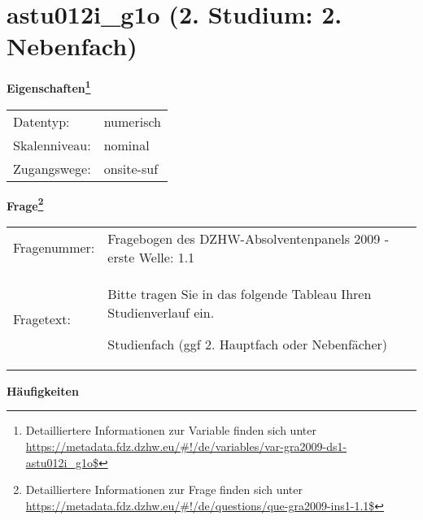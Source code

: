 
    \setcounter{footnote}{0}

    \vspace*{-1.8cm}
	\section{astu012i\_g1o (2. Studium: 2. Nebenfach)}
	\label{section:astu012i_g1o}



    \vspace*{0.5cm}
    \noindent\textbf{Eigenschaften\footnote{Detailliertere Informationen zur Variable finden sich unter
		\url{https://metadata.fdz.dzhw.eu/\#!/de/variables/var-gra2009-ds1-astu012i_g1o$}}}\\
	\begin{tabularx}{\hsize}{@{}lX}
	Datentyp: & numerisch \\
	Skalenniveau: & nominal \\
	Zugangswege: &
	  onsite-suf
 \\
    \end{tabularx}



				\vspace*{0.5cm}
                \noindent\textbf{Frage\footnote{Detailliertere Informationen zur Frage finden sich unter
		              \url{https://metadata.fdz.dzhw.eu/\#!/de/questions/que-gra2009-ins1-1.1$}}}\\
				\begin{tabularx}{\hsize}{@{}lX}
					Fragenummer: &
					  Fragebogen des DZHW-Absolventenpanels 2009 - erste Welle:
					  1.1
 \\
					Fragetext: & Bitte tragen Sie in das folgende Tableau Ihren Studienverlauf ein.\par  Studienfach (ggf 2. Hauptfach oder Nebenfächer) \\
				\end{tabularx}





        		\vspace*{0.5cm}
                \noindent\textbf{Häufigkeiten}


